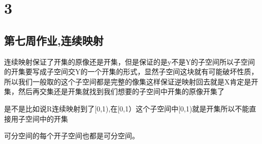 \chapter{3}
\section{第七周作业,连续映射}
\begin{dxtips}
    连续映射保证了开集的原像还是开集，但是保证的是y不是Y的子空间所以子空间的开集要写成子空间交Y的一个开集的形式，显然子空间这块就有可能破坏性质，所以我们一般取的这个子空间都是完整的像集这样保证逆映射回去就是X肯定是开集，然后再交集还是开集就找到我们想要的子空间中开集的原像开集了
\end{dxtips}
\begin{example}
    是不是比如说R连续映射到了[0,1),在[0,1）这个子空间中[0,1)就是开集所以不能直接用子空间中的开集
\end{example}
    

\begin{homework}[2.1]
可分空间的每个开子空间也都是可分空间。
\end{homework}

